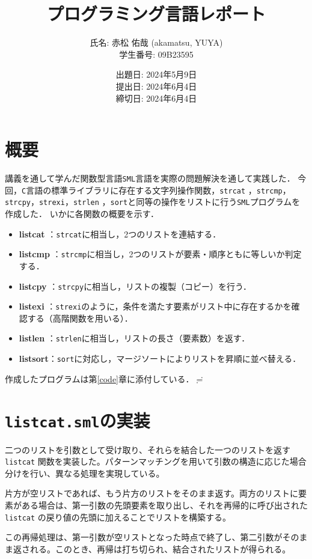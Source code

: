 \documentclass[autodetect-engine,dvi=dvipdfmx,ja=standard,
               a4j,11pt]{bxjsarticle}
\title{プログラミング言語レポート}
\author{氏名: 赤松 佑哉 (akamatsu, YUYA) \\
        学生番号: 09B23595}
\date{出題日: 2024年5月9日 \\
      提出日: 2024年6月4日 \\
      締切日: 2024年6月4日 \\}  %
\begin{document}
\maketitle
\section{概要}
講義を通して学んだ関数型言語\verb|SML|言語を実際の問題解決を通して実践した．
今回，\verb|C|言語の標準ライブラリに存在する文字列操作関数，\verb|strcat|
，\verb|strcmp|，\verb|strcpy|，\verb|strexi|，\verb|strlen|
，\verb|sort|と同等の操作をリストに行う\verb|SML|プログラムを作成した．
いかに各関数の概要を示す．
\begin{itemize}
    \item \textbf{listcat} ：\verb|strcat|に相当し，2つのリストを連結する．
    \item \textbf{listcmp} ：\verb|strcmp|に相当し，2つのリストが要素・順序ともに等しいか判定する．
    \item \textbf{listcpy} ：\verb|strcpy|に相当し，リストの複製（コピー）を行う．
    \item \textbf{listexi} ：\verb|strexi|のように，条件を満たす要素がリスト中に存在するかを確認する（高階関数を用いる）．
    \item \textbf{listlen} ：\verb|strlen|に相当し，リストの長さ（要素数）を返す．
    \item \textbf{listsort}：\verb|sort|に対応し，マージソートによりリストを昇順に並べ替える．
\end{itemize}
作成したプログラムは第\ref{code}章に添付している．$\risingdotseq $
\section{\texttt{listcat.sml}の実装}

二つのリストを引数として受け取り、それらを結合した一つのリストを返す \verb|listcat| 関数を実装した。パターンマッチングを用いて引数の構造に応じた場合分けを行い、異なる処理を実現している。

片方が空リストであれば、もう片方のリストをそのまま返す。両方のリストに要素がある場合は、第一引数の先頭要素を取り出し、それを再帰的に呼び出された \verb|listcat| の戻り値の先頭に加えることでリストを構築する。

この再帰処理は、第一引数が空リストとなった時点で終了し、第二引数がそのまま返される。このとき、再帰は打ち切られ、結合されたリストが得られる。
\end{document}
